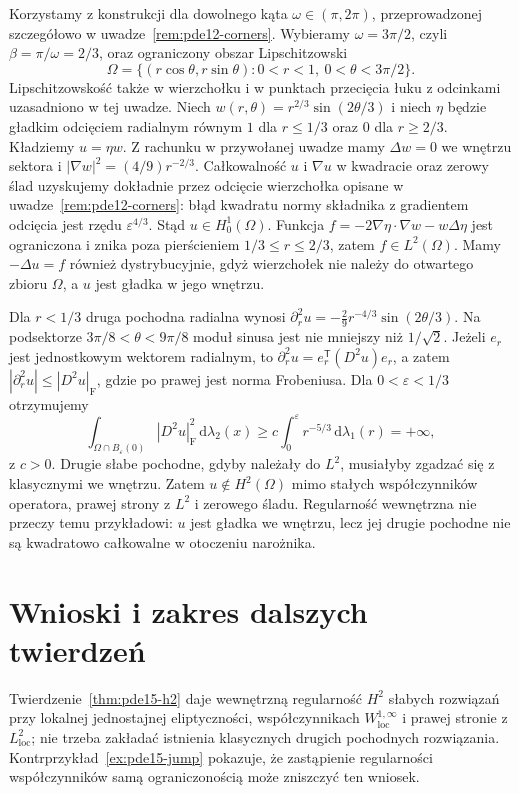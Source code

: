 \begin{kontrprzyklad}
\label{ex:pde15-corner}
Korzystamy z konstrukcji dla dowolnego kąta
$\omega\in(\pi,2\pi)$, przeprowadzonej szczegółowo
w uwadze~\ref{rem:pde12-corners}. Wybieramy
$\omega=3\pi/2$, czyli $\beta=\pi/\omega=2/3$, oraz
ograniczony obszar Lipschitzowski
\[
 \Omega=\{(r\cos\theta,r\sin\theta):0<r<1,\
                      0<\theta<3\pi/2\}.
\]
Lipschitzowskość także w wierzchołku i w punktach
przecięcia łuku z odcinkami uzasadniono w tej uwadze.
Niech $w(r,\theta)=r^{2/3}\sin(2\theta/3)$ i niech
$\eta$ będzie gładkim odcięciem radialnym równym $1$
dla $r\le1/3$ oraz $0$ dla $r\ge2/3$.
Kładziemy $u=\eta w$.
Z rachunku w przywołanej uwadze mamy
$\Delta w=0$ we wnętrzu sektora i
$|\nabla w|^2=(4/9)r^{-2/3}$.
Całkowalność $u$ i $\nabla u$ w kwadracie oraz
zerowy ślad uzyskujemy dokładnie przez odcięcie
wierzchołka opisane w uwadze~\ref{rem:pde12-corners}:
błąd kwadratu normy składnika z gradientem odcięcia
jest rzędu $\varepsilon^{4/3}$.
Stąd $u\in H_0^1(\Omega)$.
Funkcja
$f=-2\nabla\eta\cdot\nabla w-w\Delta\eta$
jest ograniczona i znika poza pierścieniem
$1/3\le r\le2/3$, zatem $f\in L^2(\Omega)$.
Mamy $-\Delta u=f$ również dystrybucyjnie, gdyż
wierzchołek nie należy do otwartego zbioru $\Omega$,
a $u$ jest gładka w jego wnętrzu.

Dla $r<1/3$ druga pochodna radialna wynosi
$\partial_r^2u=-\tfrac29 r^{-4/3}\sin(2\theta/3)$.
Na podsektorze $3\pi/8<\theta<9\pi/8$
moduł sinusa jest nie mniejszy niż $1/\sqrt2$.
Jeżeli $e_r$ jest jednostkowym wektorem radialnym,
to $\partial_r^2u=e_r^{\mathsf T}(D^2u)e_r$,
a zatem $|\partial_r^2u|\le |D^2u|_{\mathrm F}$,
gdzie po prawej jest norma Frobeniusa.
Dla $0<\varepsilon<1/3$ otrzymujemy
\[
 \int_{\Omega\cap B_\varepsilon(0)}|D^2u|_{\mathrm F}^2\,
             \mathrm d\lambda_2(x)
 \ge c\int_0^\varepsilon r^{-5/3}\,\mathrm d\lambda_1(r)
 =+\infty,
\]
z $c>0$. Drugie słabe pochodne, gdyby należały do $L^2$,
musiałyby zgadzać się z klasycznymi we wnętrzu.
Zatem $u\notin H^2(\Omega)$ mimo stałych współczynników
operatora, prawej strony z $L^2$ i zerowego śladu.
Regularność wewnętrzna nie przeczy temu przykładowi:
$u$ jest gładka we wnętrzu, lecz jej drugie pochodne
nie są kwadratowo całkowalne w otoczeniu narożnika.
\end{kontrprzyklad}

\section{Wnioski i zakres dalszych twierdzeń}
\label{sec:pde15-summary}
Twierdzenie~\ref{thm:pde15-h2} daje wewnętrzną regularność
$H^2$ słabych rozwiązań przy lokalnej jednostajnej
eliptyczności, współczynnikach $W^{1,\infty}_{\mathrm{loc}}$
i prawej stronie z $L^2_{\mathrm{loc}}$; nie trzeba zakładać
istnienia klasycznych drugich pochodnych rozwiązania.
Kontrprzykład~\ref{ex:pde15-jump} pokazuje, że zastąpienie
regularności współczynników samą ograniczonością
może zniszczyć ten wniosek.

